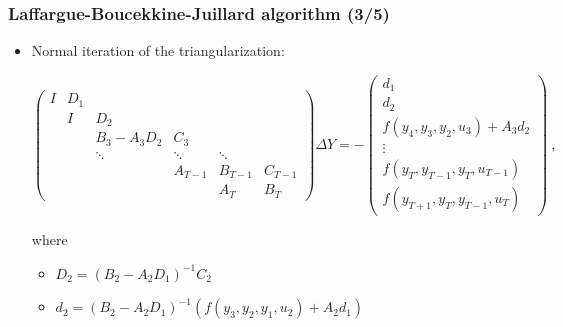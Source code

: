 \documentclass[handout,usepdftitle=false,xcolor=dvipsnames,aspectratio=169]{beamer}
\begin{document}
\begin{frame}
  \frametitle{Laffargue-Boucekkine-Juillard algorithm (3/5)}
  \begin{itemize}
    \item Normal iteration of the triangularization:
          \begin{small}
            \begin{equation}
              \begin{pmatrix}
                I & D_1 &            &         &         &         \\
                  & I   & D_2        &         &         &         \\
                  &     & B_3-A_3D_2 & C_3     &         &         \\
                  &     & \ddots     & \ddots  & \ddots  &         \\
                  &     &            & A_{T-1} & B_{T-1} & C_{T-1} \\
                  &     &            &         & A_T     & B_T
              \end{pmatrix}
              \Delta Y
              =
              -\begin{pmatrix}
                d_1                            \\
                d_2                            \\
                f(y_4,y_3,y_2,u_3) + A_3d_2    \\
                \vdots                         \\
                f(y_{T},y_{T-1},y_{T},u_{T-1}) \\
                f(y_{T+1},y_T,y_{T-1},u_T)
              \end{pmatrix} \: ,
            \end{equation}
          \end{small}

          where

          \begin{itemize}
            \item $D_2 = (B_2-A_2D_1)^{-1}C_2$
            \item $d_2 = (B_2-A_2D_1)^{-1}(f(y_3,y_2,y_1,u_2)+A_2d_1)$
          \end{itemize}
  \end{itemize}
\end{frame}
\end{document}

